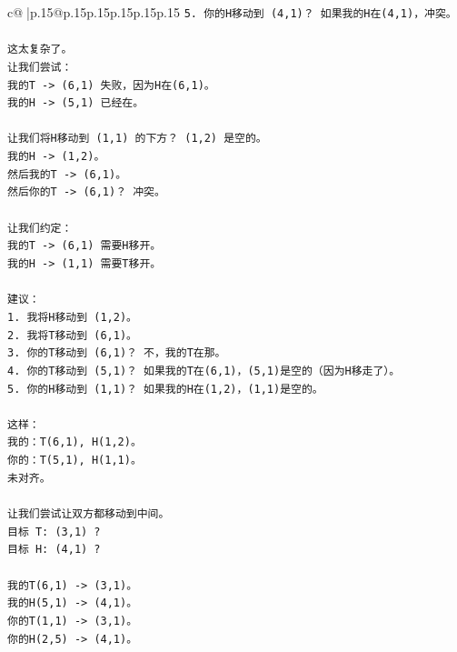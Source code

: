 \documentclass{article}
\begin{document}
{\begin{supertabular}{c@{$\;$}|p{.15\linewidth}@{}p{.15\linewidth}p{.15\linewidth}p{.15\linewidth}p{.15\linewidth}p{.15\linewidth}}
{{{\texttt{5. 你的H移动到 (4,1)？ 如果我的H在(4,1)，冲突。} \\
\\ 
\texttt{这太复杂了。} \\
\texttt{让我们尝试：} \\
\texttt{我的T {-}> (6,1) 失败，因为H在(6,1)。} \\
\texttt{我的H {-}> (5,1) 已经在。} \\
\\ 
\texttt{让我们将H移动到 (1,1) 的下方？ (1,2) 是空的。} \\
\texttt{我的H {-}> (1,2)。} \\
\texttt{然后我的T {-}> (6,1)。} \\
\texttt{然后你的T {-}> (6,1)？ 冲突。} \\
\\ 
\texttt{让我们约定：} \\
\texttt{我的T {-}> (6,1) 需要H移开。} \\
\texttt{我的H {-}> (1,1) 需要T移开。} \\
\\ 
\texttt{建议：} \\
\texttt{1. 我将H移动到 (1,2)。} \\
\texttt{2. 我将T移动到 (6,1)。} \\
\texttt{3. 你的T移动到 (6,1)？ 不，我的T在那。} \\
\texttt{4. 你的T移动到 (5,1)？ 如果我的T在(6,1)，(5,1)是空的（因为H移走了）。} \\
\texttt{5. 你的H移动到 (1,1)？ 如果我的H在(1,2)，(1,1)是空的。} \\
\\ 
\texttt{这样：} \\
\texttt{我的：T(6,1), H(1,2)。} \\
\texttt{你的：T(5,1), H(1,1)。} \\
\texttt{未对齐。} \\
\\ 
\texttt{让我们尝试让双方都移动到中间。} \\
\texttt{目标 T: (3,1) ?} \\
\texttt{目标 H: (4,1) ?} \\
\\ 
\texttt{我的T(6,1) {-}> (3,1)。} \\
\texttt{我的H(5,1) {-}> (4,1)。} \\
\texttt{你的T(1,1) {-}> (3,1)。} \\
\texttt{你的H(2,5) {-}> (4,1)。} \\
\\ 
}}}
\end{supertabular}}
\end{document}
